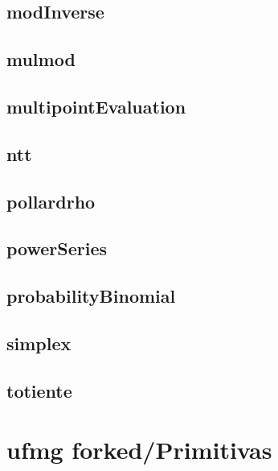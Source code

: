\subsection{modInverse}
\raggedbottom
\hrulefill
\subsection{mulmod}
\raggedbottom
\hrulefill
\subsection{multipointEvaluation}
\raggedbottom
\hrulefill
\subsection{ntt}
\raggedbottom
\hrulefill
\subsection{pollardrho}
\raggedbottom
\hrulefill
\subsection{powerSeries}
\raggedbottom
\hrulefill
\subsection{probabilityBinomial}
\raggedbottom
\hrulefill
\subsection{simplex}
\raggedbottom
\hrulefill
\subsection{totiente}
\raggedbottom
\hrulefill

\section{ufmg forked/Primitivas}
